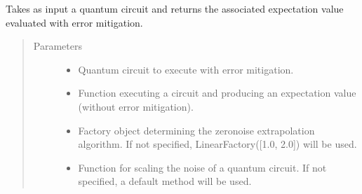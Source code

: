 \documentclass[letterpaper,10pt,english]{sphinxmanual}
\begin{document}
\begin{fulllineitems}
\label{\detokenize{index:mitiq.zne.execute_with_zne}}
Takes as input a quantum circuit and returns the associated expectation value
evaluated with error mitigation.
\begin{quote}\begin{description}
\item[{Parameters}] \leavevmode\begin{itemize}
\item {} 
 \sphinxhyphen{}\sphinxhyphen{} Quantum circuit to execute with error mitigation.

\item {} 
 \sphinxhyphen{}\sphinxhyphen{} Function executing a circuit and producing an expectation value
(without error mitigation).

\item {} 
 \sphinxhyphen{}\sphinxhyphen{} Factory object determining the zero\sphinxhyphen{}noise extrapolation algorithm.
If not specified, LinearFactory({[}1.0, 2.0{]}) will be used.

\item {} 
 \sphinxhyphen{}\sphinxhyphen{} Function for scaling the noise of a quantum circuit.
If not specified, a default method will be used.

\end{itemize}

\end{description}\end{quote}

\end{fulllineitems}

\end{document}
